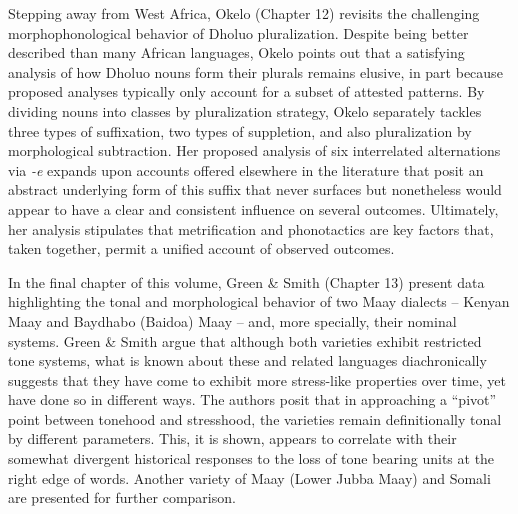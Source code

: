 \documentclass[output=paper,colorlinks,citecolor=brown]{langscibook}
\begin{document}
Stepping away from West Africa, Okelo (Chapter 12) revisits the challenging morphophonological behavior of Dholuo pluralization. Despite being better described than many African languages, Okelo points out that a satisfying analysis of how Dholuo nouns form their plurals remains elusive, in part because proposed analyses typically only account for a subset of attested patterns. By dividing nouns into classes by pluralization strategy, Okelo separately tackles three types of suffixation, two types of suppletion, and also pluralization by morphological subtraction. Her proposed analysis of six interrelated alternations via \textit{-e} expands upon accounts offered elsewhere in the literature that posit an abstract underlying form of this suffix that never surfaces but nonetheless would appear to have a clear and consistent influence on several outcomes. Ultimately, her analysis stipulates that metrification and phonotactics are key factors that, taken together, permit a unified account of observed outcomes.

In the final chapter of this volume, Green \& Smith (Chapter 13) present data highlighting the tonal and morphological behavior of two Maay dialects -- Kenyan Maay and Baydhabo (Baidoa) Maay -- and, more specially, their nominal systems. Green \& Smith argue that although both varieties exhibit restricted tone systems, what is known about these and related languages diachronically suggests that they have come to exhibit more stress-like properties over time, yet have done so in different ways. The authors posit that in approaching a ``pivot'' point between tonehood and stresshood, the varieties remain definitionally tonal by different parameters. This, it is shown, appears to correlate with their somewhat divergent historical responses to the loss of tone bearing units at the right edge of words. Another variety of Maay (Lower Jubba Maay) and Somali are presented for further comparison.

{\sloppy\printbibliography[heading=subbibliography,notkeyword=this]}
\end{document}
